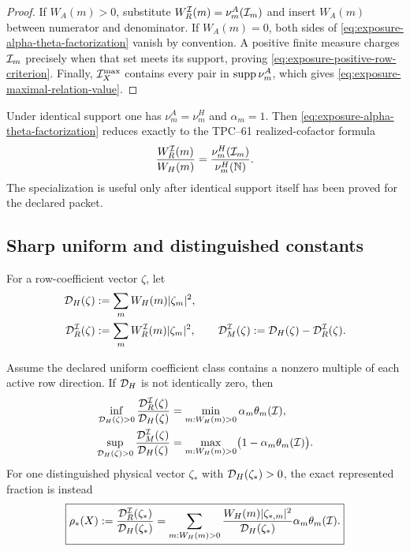 \begin{proof}
If \(W_A(m)>0\), substitute
\(W_R^{\mathcal I}(m)=\nu_m^A(\mathcal I_m)\) and insert \(W_A(m)\) between numerator
and denominator.  If \(W_A(m)=0\), both sides of
\eqref{eq:exposure-alpha-theta-factorization} vanish by convention.  A
positive finite measure charges \(\mathcal I_m\) precisely when that set meets
its support, proving \eqref{eq:exposure-positive-row-criterion}.  Finally,
\(\mathcal I_X^{\max}\) contains every pair in \(\operatorname{supp}\nu_m^A\), which gives
\eqref{eq:exposure-maximal-relation-value}.
\end{proof}

Under identical support one has \(\nu_m^A=\nu_m^H\) and
\(\alpha_m=1\).  Then \eqref{eq:exposure-alpha-theta-factorization}
reduces exactly to the TPC--61 realized-cofactor formula
\begin{equation}
 \frac{W_R^{\mathcal I}(m)}{W_H(m)}
 =\frac{\nu_m^H(\mathcal I_m)}{\nu_m^H(\mathbb N)}.
 \label{eq:exposure-identical-support-specialization}
\end{equation}
The specialization is useful only after identical support itself has been
proved for the declared packet.

\subsection{Sharp uniform and distinguished constants}

For a row-coefficient vector \(\zeta\), let
\begin{align}
 \mathcal D_H(\zeta)
 &:=\sum_mW_H(m)|\zeta_m|^2,
 \label{eq:exposure-DH}\\
 \mathcal D_R^{\mathcal I}(\zeta)
 &:=\sum_mW_R^{\mathcal I}(m)|\zeta_m|^2,
 \qquad
 \mathcal D_M^{\mathcal I}(\zeta)
 :=\mathcal D_H(\zeta)-\mathcal D_R^{\mathcal I}(\zeta).
 \label{eq:exposure-DR-DM}
\end{align}

\begin{theorem}
\label{thm:exposure-uniform-distinguished-minimax}
Assume the declared uniform coefficient class contains a nonzero multiple
of each active row direction.  If \(\mathcal D_H\) is not identically zero, then
\begin{align}
 \inf_{\mathcal D_H(\zeta)>0}
 \frac{\mathcal D_R^{\mathcal I}(\zeta)}{\mathcal D_H(\zeta)}
 &=\min_{m:W_H(m)>0}\alpha_m\theta_m(\mathcal I),
 \label{eq:exposure-uniform-minimum}\\
 \sup_{\mathcal D_H(\zeta)>0}
 \frac{\mathcal D_M^{\mathcal I}(\zeta)}{\mathcal D_H(\zeta)}
 &=\max_{m:W_H(m)>0}
   \bigl(1-\alpha_m\theta_m(\mathcal I)\bigr).
 \label{eq:exposure-uniform-maximum}
\end{align}
For one distinguished physical vector \(\zeta_*\) with
\(\mathcal D_H(\zeta_*)>0\), the exact represented fraction is instead
\begin{equation}
 \boxed{
 \rho_*(X)
 :=\frac{\mathcal D_R^{\mathcal I}(\zeta_*)}{\mathcal D_H(\zeta_*)}
 =\sum_{m:W_H(m)>0}
 \frac{W_H(m)|\zeta_{*,m}|^2}{\mathcal D_H(\zeta_*)}
 \alpha_m\theta_m(\mathcal I).}
 \label{eq:exposure-distinguished-average}
\end{equation}
\end{theorem}

